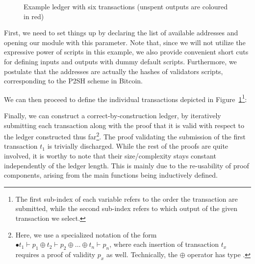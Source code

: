 \documentclass[acmsmall,nonacm=true,screen=true]{acmart}
\begin{document}
\begin{figure}
\caption{Example ledger with six transactions (unspent outputs are coloured in red)}
\label{fig:utxo-ledger}
\end{figure}

First, we need to set things up by declaring the list of available addresses and opening our module with this parameter.
\UTXOexampleSetup{}
Note that, since we will not utilize the expressive power of scripts in this example, we also provide convenient short cuts for
defining inputs and outputs with dummy default scripts.
Furthermore, we postulate that the addresses are actually the hashes of validators scripts, corresponding to the P2SH scheme
in Bitcoin.

We can then proceed to define the individual transactions depicted in Figure~\ref{fig:utxo-ledger}\footnote{
The first sub-index of each variable refers to the order the transaction are submitted,
while the second sub-index refers to which output of the given transaction we select.}:
\UTXOexampleA{}

Finally, we can construct a correct-by-construction ledger, by iteratively submitting each transaction along with
the proof that it is valid with respect to the ledger constructed thus far\footnote{
Here, we use a specialized notation of the form $\bullet t_1 \vdash p_1 \oplus t_2 \vdash p_2 \oplus \dots \oplus t_n \vdash p_n$,
where each insertion of transaction $t_x$ requires a proof of validity $p_x$ as well.
Technically, the $\oplus$ operator has type \inlineListCons{}.
}.
\UTXOexampleB{}
The proof validating the submission of the first transaction $t_1$ is trivially discharged.
While the rest of the proofs are quite involved, it is worthy to note that their size/complexity stays constant
independently of the ledger length. This is mainly due to the re-usability of proof components, arising from
the main functions being inductively defined.
\end{document}
